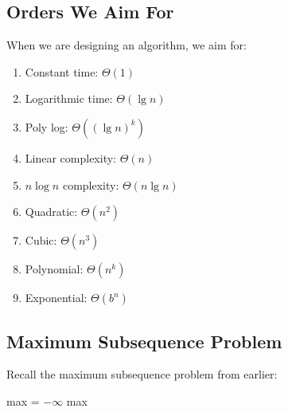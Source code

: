 \documentclass[]{article}
\theoremstyle{definition}
\begin{document}
		\subsection{Orders We Aim For}
			When we are designing an algorithm, we aim for:
			\begin{enumerate}
				\item Constant time: $\Theta(1)$
				\item Logarithmic time: $\Theta(\lg n)$
				\item Poly log: $\Theta((\lg n)^{k})$
				\item Linear complexity: $\Theta(n)$
				\item $n \log n$ complexity: $\Theta(n \lg n)$
				\item Quadratic: $\Theta(n^2)$
				\item Cubic: $\Theta(n^3)$
				\item Polynomial: $\Theta(n^k)$
				\item Exponential: $\Theta(b^n)$
			\end{enumerate}

		\subsection{Maximum Subsequence Problem}
			Recall the maximum subsequence problem from earlier: \\
			\begin{algorithm}[H]
				max = $-\infty$\;
				\Return max
			\end{algorithm}
			
\end{document}
